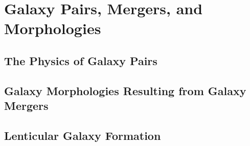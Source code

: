 
\chapter{Galaxy Pairs, Mergers, and Morphologies} %
\label{Chapter:GalPairs}

\section{The Physics of Galaxy Pairs}

\section{Galaxy Morphologies Resulting from Galaxy Mergers}

\section{Lenticular Galaxy Formation}
